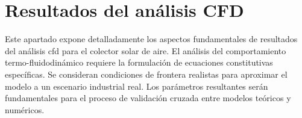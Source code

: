 \section{Resultados del análisis CFD}
\label{sec:cap09_cfd}

Este apartado expone detalladamente los aspectos fundamentales de resultados del análisis cfd para el colector solar de aire.
El análisis del comportamiento termo-fluidodinámico requiere la formulación de ecuaciones constitutivas específicas.
Se consideran condiciones de frontera realistas para aproximar el modelo a un escenario industrial real.
Los parámetros resultantes serán fundamentales para el proceso de validación cruzada entre modelos teóricos y numéricos.
